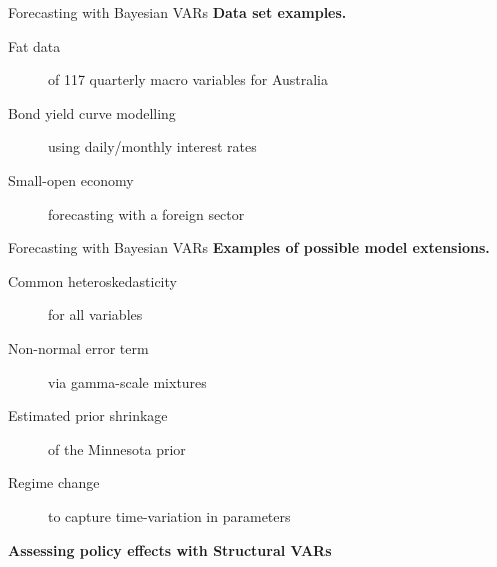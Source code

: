 \documentclass[notes,blackandwhite,mathsans]{beamer}
\begin{document}
\begin{frame}{Forecasting with Bayesian VARs}
\textbf{Data set examples. }
\bigskip
\begin{description}
\item[Fat data] {\color{mcxs2}of 117 quarterly macro variables for Australia} \\ [1ex]
\item[Bond yield curve modelling] {\color{mcxs2}using daily/monthly interest rates} \\ [1ex]
\item[Small-open economy] {\color{mcxs2}forecasting with a foreign sector} \\ [1ex]
\item[] {\color{mcxs2} }
\end{description}
\end{frame}



\begin{frame}{Forecasting with Bayesian VARs}
\textbf{Examples of possible model extensions. }
\bigskip
\begin{description}
\item[Common heteroskedasticity] {\color{mcxs2}for all variables}\\ [1ex]
\item[Non-normal error term] {\color{mcxs2}via gamma-scale mixtures}\\ [1ex]
\item[Estimated prior shrinkage] {\color{mcxs2}of the Minnesota prior}\\ [1ex]
\item[Regime change] {\color{mcxs2} to capture time-variation in parameters}
\end{description}
\end{frame}










{
\begin{frame}

\begin{adjustwidth}{-0.5cm}{0cm}
\vspace{8.3cm}\Large
\textbf{{\color{mcxs3}Assessing policy effects with  } {\color{mcxs1}Structural VARs}}
\end{adjustwidth}

\end{frame}
}
\end{document}
